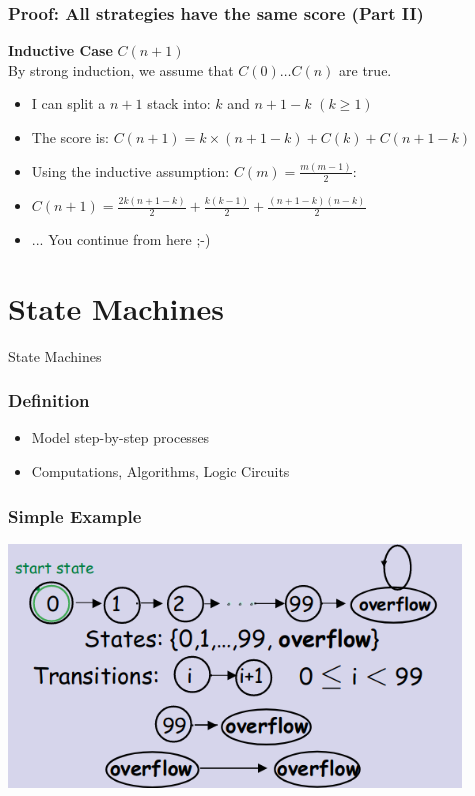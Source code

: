 \documentclass{beamer}
\begin{document}
\begin{frame}
  \frametitle{Proof: All strategies have the same score (Part II)}
  
  {\larger
    
    {\bf Inductive Case} $C(n+1)$\\
    By strong induction, we assume that $C(0)\ldots C(n)$ are true.
    
    \bigskip
    
    \begin{itemize}
    \item I can split a $n+1$ stack into: $k$ and $n+1-k$ $(k \geq 1)$
    \item The score is: $C(n+1) = k\times(n+1-k) + C(k) + C(n+1-k)$
    \item Using the inductive assumption: $C(m) = \frac{m(m-1)}{2}$:
    \item $C(n+1) = \frac{2k(n+1-k)}{2} + \frac{k(k-1)}{2} +
      \frac{(n+1-k)(n-k)}{2}$
    \item ... You continue from here ;-)
    \end{itemize}
    
  }
\end{frame}

\section{State Machines}

\begin{frame}
  \begin{center}
    {\huge
      State Machines
    }
  \end{center}
\end{frame}

\begin{frame}
  \frametitle{Definition}
  {\larger
    \begin{itemize}
    \item Model step-by-step processes
      
      \bigskip
      
    \item Computations, Algorithms, Logic Circuits
    \end{itemize}
  }
\end{frame}

\begin{frame}
  \frametitle{Simple Example}

  \begin{center}
    \includegraphics[width=0.9\textwidth]{../img/statemachine}
  \end{center}
\end{frame}
\end{document}
